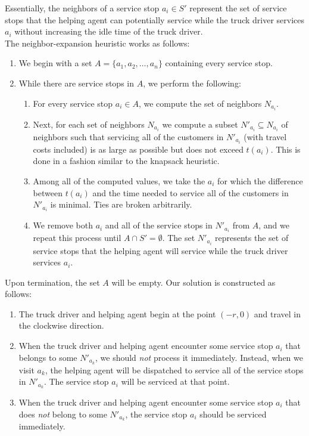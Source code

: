 \documentclass[12pt]{scrartcl}
\begin{document}
Essentially, the neighbors of a service stop $a_i \in S'$ represent the set of service stops that the helping agent can potentially service while the truck driver services $a_i$ without increasing the idle time of the truck driver. \\ 

The neighbor-expansion heuristic works as follows:

\begin{enumerate}
    \item We begin with a set $A = \{a_1, a_2, \ldots, a_n\}$ containing every service stop.
    \item While there are service stops in $A$, we perform the following: 
    \begin{enumerate}
        \item For every service stop $a_i \in A$, we compute the set of neighbors $N_{a_{i}}$. 
        \item Next, for each set of neighbors $N_{a_i}$ we compute a subset $N'_{a_i} \subseteq N_{a_i}$ of neighbors such that servicing all of the customers in $N'_{a_i}$ (with travel costs included) is as large as possible but does not exceed $t(a_i)$. This is done in a fashion similar to the knapsack heuristic.
        \item Among all of the computed values, we take the $a_i$ for which the difference between $t(a_i)$ and the time needed to service all of the customers in $N'_{a_i}$ is minimal. Ties are broken arbitrarily. 
				\item We remove both $a_i$ and all of the service stops in $N'_{a_i}$ from $A$, and we repeat this process until $A \cap S' = \emptyset.$ The set $N'_{a_i}$ represents the set of service stops that the helping agent will service while the truck driver services $a_i$. 
    \end{enumerate}
\end{enumerate}

\noindent Upon termination, the set $A$ will be empty. Our solution is constructed as follows:

\begin{enumerate}
	\item The truck driver and helping agent begin at the point $(-r, 0)$ and travel in the clockwise direction.
	\item	When the truck driver and helping agent encounter some service stop $a_i$ that belongs to some $N'_{a_k}$, we should \textit{not} process it immediately. Instead, when we visit $a_k$, the helping agent will be dispatched to service all of the service stops in $N'_{a_k}$. The service stop $a_i$ will be serviced at that point.
	\item When the truck driver and helping agent encounter some service stop $a_i$ that does \textit{not} belong to some $N'_{a_k}$, the service stop $a_i$ should be serviced immediately. 
\end{enumerate}
\end{document}
